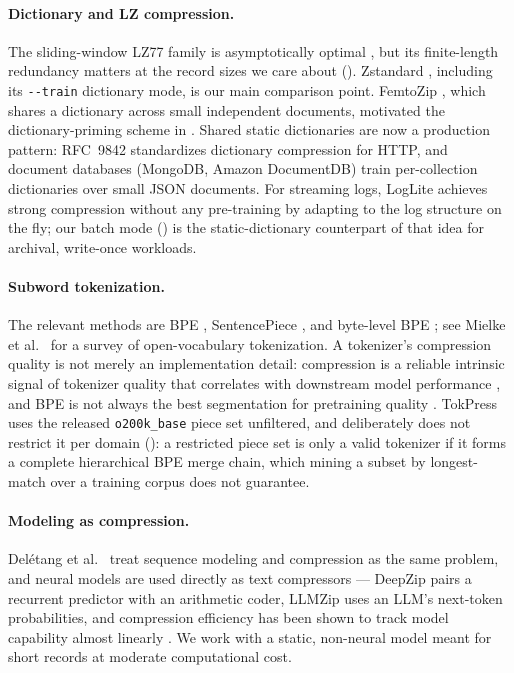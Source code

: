 \documentclass[10pt,twocolumn]{article}
\theoremstyle{plain}
\theoremstyle{definition}
\begin{document}
\paragraph{Dictionary and LZ compression.} The sliding-window LZ77 family
\cite{zl1978} is asymptotically optimal \cite{wynerziv1994}, but its finite-length
redundancy \cite{louchard1997} matters at the record sizes we care about
(). Zstandard \cite{rfc8478}, including its \verb|--train|
dictionary mode, is our main comparison point. FemtoZip \cite{femtozip}, which shares
a dictionary across small independent documents, motivated the dictionary-priming
scheme in . Shared static dictionaries are now a production pattern:
RFC~9842 standardizes dictionary compression for HTTP, and document databases
(MongoDB, Amazon DocumentDB) train per-collection dictionaries over small JSON
documents. For streaming logs, LogLite \cite{loglite2025} achieves strong
compression without any pre-training by adapting to the log structure on the fly; our
batch mode () is the static-dictionary counterpart of that idea for
archival, write-once workloads.

\paragraph{Subword tokenization.} The relevant methods are BPE \cite{gage1994,
sennrich2016}, SentencePiece \cite{kudo2018,kudo2018sp}, and byte-level BPE
\cite{radford2019}; see Mielke et al.\ \cite{mielke2021} for a survey of
open-vocabulary tokenization. A tokenizer's compression quality is not merely an
implementation detail: compression is a reliable intrinsic signal of tokenizer
quality that correlates with downstream model performance
\cite{goldman2024,zouhar2023}, and BPE is not always the best segmentation for
pretraining quality \cite{bostrom2020}. TokPress uses the released
\texttt{o200k\_base} piece set
\cite{tiktoken2024} unfiltered, and deliberately does not restrict it per domain
(): a restricted piece set is only a valid tokenizer if it forms a
complete hierarchical BPE merge chain, which mining a subset by longest-match over a
training corpus does not guarantee.

\paragraph{Modeling as compression.} Del\'{e}tang et al.\ \cite{deletang2023} treat
sequence modeling and compression as the same problem, and neural models are used
directly as text compressors --- DeepZip \cite{deepzip2018} pairs a recurrent
predictor with an arithmetic coder, LLMZip \cite{llmzip2023} uses an LLM's
next-token probabilities, and compression efficiency has been shown to
track model capability almost linearly \cite{huang2024compression}. We work with a
static, non-neural model meant for short records at moderate computational cost.
\end{document}
